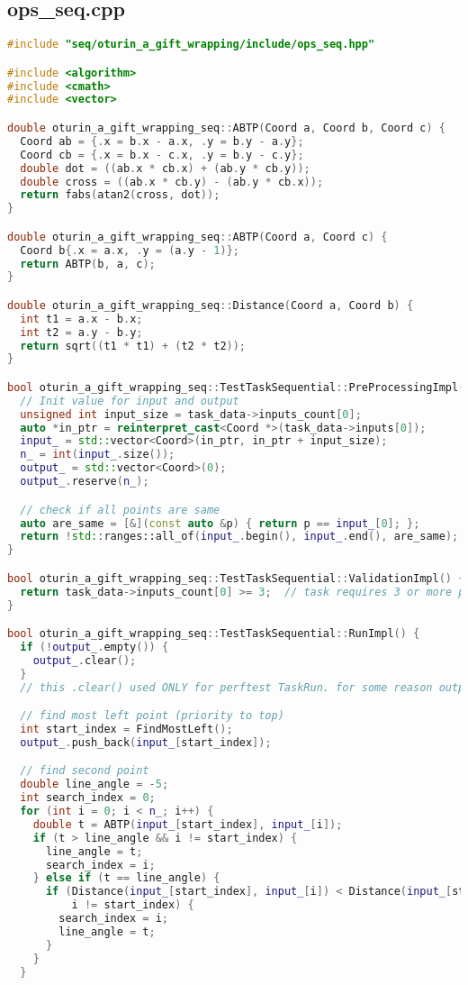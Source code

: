 \documentclass[12pt,a4paper]{extarticle}
\begin{document}
\subsection{ops\_seq.cpp}
\label{sec:seq.cpp}
\begin{lstlisting}[language=C++]
#include "seq/oturin_a_gift_wrapping/include/ops_seq.hpp"

#include <algorithm>
#include <cmath>
#include <vector>

double oturin_a_gift_wrapping_seq::ABTP(Coord a, Coord b, Coord c) {
  Coord ab = {.x = b.x - a.x, .y = b.y - a.y};
  Coord cb = {.x = b.x - c.x, .y = b.y - c.y};
  double dot = ((ab.x * cb.x) + (ab.y * cb.y));
  double cross = ((ab.x * cb.y) - (ab.y * cb.x));
  return fabs(atan2(cross, dot));
}

double oturin_a_gift_wrapping_seq::ABTP(Coord a, Coord c) {
  Coord b{.x = a.x, .y = (a.y - 1)};
  return ABTP(b, a, c);
}

double oturin_a_gift_wrapping_seq::Distance(Coord a, Coord b) {
  int t1 = a.x - b.x;
  int t2 = a.y - b.y;
  return sqrt((t1 * t1) + (t2 * t2));
}

bool oturin_a_gift_wrapping_seq::TestTaskSequential::PreProcessingImpl() {
  // Init value for input and output
  unsigned int input_size = task_data->inputs_count[0];
  auto *in_ptr = reinterpret_cast<Coord *>(task_data->inputs[0]);
  input_ = std::vector<Coord>(in_ptr, in_ptr + input_size);
  n_ = int(input_.size());
  output_ = std::vector<Coord>(0);
  output_.reserve(n_);

  // check if all points are same
  auto are_same = [&](const auto &p) { return p == input_[0]; };
  return !std::ranges::all_of(input_.begin(), input_.end(), are_same);
}

bool oturin_a_gift_wrapping_seq::TestTaskSequential::ValidationImpl() {
  return task_data->inputs_count[0] >= 3;  // task requires 3 or more points to wrap
}

bool oturin_a_gift_wrapping_seq::TestTaskSequential::RunImpl() {
  if (!output_.empty()) {
    output_.clear();
  }
  // this .clear() used ONLY for perftest TaskRun. for some reason output_ has something in it

  // find most left point (priority to top)
  int start_index = FindMostLeft();
  output_.push_back(input_[start_index]);

  // find second point
  double line_angle = -5;
  int search_index = 0;
  for (int i = 0; i < n_; i++) {
    double t = ABTP(input_[start_index], input_[i]);
    if (t > line_angle && i != start_index) {
      line_angle = t;
      search_index = i;
    } else if (t == line_angle) {
      if (Distance(input_[start_index], input_[i]) < Distance(input_[start_index], input_[search_index]) &&
          i != start_index) {
        search_index = i;
        line_angle = t;
      }
    }
  }


\end{lstlisting}
\end{document}

